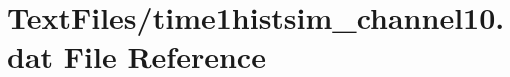 \hypertarget{TextFiles_2time1histsim__channel10_8dat}{}\section{Text\+Files/time1histsim\+\_\+channel10.dat File Reference}
\label{TextFiles_2time1histsim__channel10_8dat}
